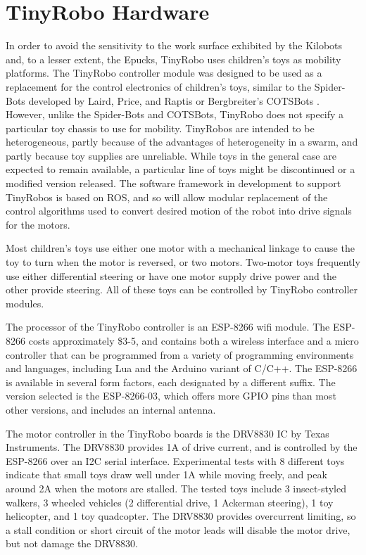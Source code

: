 \documentclass[letterpaper, 10 pt, conference]{ieeeconf}  %
\begin{document}
\section{TinyRobo Hardware}

In order to avoid the sensitivity to the work surface exhibited by the Kilobots and, to a lesser extent, the Epucks, TinyRobo uses children's toys as mobility platforms. 
The TinyRobo controller module was designed to be used as a replacement for the control electronics of children's toys, similar to the Spider-Bots developed by Laird, Price, and Raptis or Bergbreiter's COTSBots \cite{lairdspider, bergbreiter2003cotsbots}.
However, unlike the Spider-Bots and COTSBots, TinyRobo does not specify a particular toy chassis to use for mobility. 
TinyRobos are intended to be heterogeneous, partly because of the advantages of heterogeneity in a swarm, and partly because toy supplies are unreliable.
While toys in the general case are expected to remain available, a particular line of toys might be discontinued or a modified version released. 
The software framework in development to support TinyRobos is based on ROS, and so will allow modular replacement of the control algorithms used to convert desired motion of the robot into drive signals for the motors. 
 
Most children's toys use either one motor with a mechanical linkage to cause the toy to turn when the motor is reversed, or two motors.
Two-motor toys frequently use either differential steering or have one motor supply drive power and the other provide steering. 
All of these toys can be controlled by TinyRobo controller modules.

The processor of the TinyRobo controller is an ESP-8266 wifi module.
The ESP-8266 costs approximately \$3-5, and contains both a wireless interface and a micro controller that can be programmed from a variety of programming environments and languages, including Lua and the Arduino variant of C/C++.   
The ESP-8266 is available in several form factors, each designated by a different suffix. 
The version selected is the ESP-8266-03, which offers more GPIO pins than most other versions, and includes an internal antenna.

The motor controller in the TinyRobo boards is the DRV8830 IC by Texas Instruments. 
The DRV8830 provides 1A of drive current, and is controlled by the ESP-8266 over an I2C serial interface. 
Experimental tests with 8 different toys indicate that small toys draw well under 1A while moving freely, and peak around 2A when the motors are stalled. 
The tested toys include 3 insect-styled walkers, 3 wheeled vehicles (2 differential drive, 1 Ackerman steering), 1 toy helicopter, and 1 toy quadcopter.
The DRV8830 provides overcurrent limiting, so a stall condition or short circuit of the motor leads will disable the motor drive, but not damage the DRV8830. 
\end{document}

